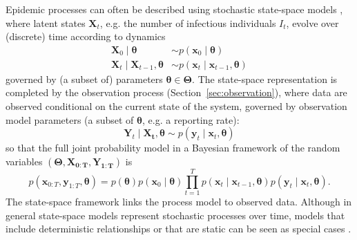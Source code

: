 \documentclass{article}
\begin{document}
Epidemic processes can often be described using stochastic state-space models \citep{birrell2018evidence}, where latent states $\boldsymbol{X}_t$, e.g. the number of infectious individuals $I_t$, evolve over (discrete) time according to dynamics 
\begin{align*}
\boldsymbol{X}_{0} \mid \boldsymbol{\theta} & \sim p(\boldsymbol{x}_0 \mid \boldsymbol{\theta}) \\
\boldsymbol{X}_{t} \mid \boldsymbol{X}_{t-1}, \boldsymbol{\theta} & \sim p(\boldsymbol{x}_t \mid \boldsymbol{x}_{t-1}, \boldsymbol{\theta})
\end{align*}
governed by (a subset of) parameters $\boldsymbol{\theta} \in \boldsymbol{\Theta}$. The state-space representation is completed by the observation process (Section~\ref{sec:observation}), where data are observed conditional on the current state of the system, governed by observation model parameters (a subset of $\boldsymbol{\theta}$, e.g. a reporting rate):
$$
\boldsymbol{Y}_{t} \mid \boldsymbol{X_t}, \boldsymbol{\theta} \sim p(\boldsymbol{y}_t \mid \boldsymbol{x}_t, \boldsymbol{\theta}) 
$$
so that the full joint probability model in a Bayesian framework of the random variables $(\boldsymbol{\Theta}, \boldsymbol{X_{0:T}}
, \boldsymbol{Y_{1:T}})$ is
$$
p(\boldsymbol{x}_{0:T}, \boldsymbol{y}_{1:T} , \boldsymbol{\theta}) = p(\boldsymbol{\theta})p(\boldsymbol{x}_0 \mid \boldsymbol{\theta})\prod_{t=1}^T p(\boldsymbol{x}_t \mid \boldsymbol{x}_{t-1}, \boldsymbol{\theta})p(\boldsymbol{y}_t \mid \boldsymbol{x}_t, \boldsymbol{\theta}).
$$
The state-space framework links the process model to observed data. Although in general state-space models represent stochastic processes over time, models that include deterministic relationships or that are static can be seen as special cases \citep{birrell2018evidence}. 
\end{document}
